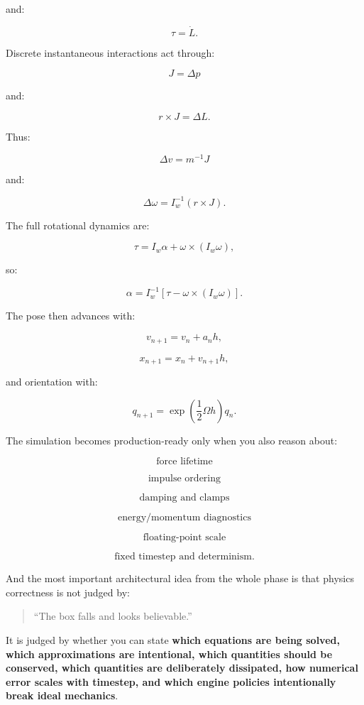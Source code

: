and:

\[
\boxed{
\tau=\dot L.
}
\]

Discrete instantaneous interactions act through:

\[
\boxed{
J=\Delta p
}
\]

and:

\[
\boxed{
r\times J=\Delta L.
}
\]

Thus:

\[
\boxed{
\Delta v=m^{-1}J
}
\]

and:

\[
\boxed{
\Delta\omega
=
I_w^{-1}(r\times J).
}
\]

The full rotational dynamics are:

\[
\boxed{
\tau
=
I_w\alpha+
\omega\times(I_w\omega),
}
\]

so:

\[
\boxed{
\alpha
=
I_w^{-1}
[
\tau-\omega\times(I_w\omega)
].
}
\]

The pose then advances with:

\[
\boxed{
v_{n+1}
=
v_n+a_nh,
}
\]

\[
\boxed{
x_{n+1}
=
x_n+v_{n+1}h,
}
\]

and orientation with:

\[
\boxed{
q_{n+1}
=
\exp
\left(
\frac12\Omega h
\right)
q_n.
}
\]

The simulation becomes production-ready only when you also reason about:

\[
\boxed{
\text{force lifetime}
}
\]

\[
\boxed{
\text{impulse ordering}
}
\]

\[
\boxed{
\text{damping and clamps}
}
\]

\[
\boxed{
\text{energy/momentum diagnostics}
}
\]

\[
\boxed{
\text{floating-point scale}
}
\]

\[
\boxed{
\text{fixed timestep and determinism}.
}
\]

And the most important architectural idea from the whole phase is that physics correctness is not judged by:

\begin{quote}
``The box falls and looks believable.''
\end{quote}

It is judged by whether you can state \textbf{which equations are being solved, which approximations are intentional, which quantities should be conserved, which quantities are deliberately dissipated, how numerical error scales with timestep, and which engine policies intentionally break ideal mechanics}.

